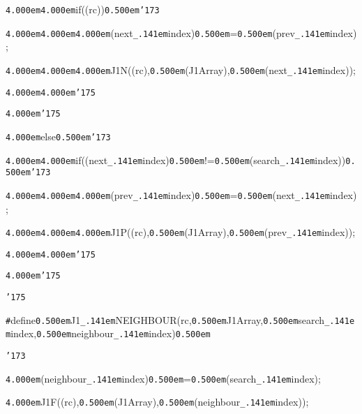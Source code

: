 \noindent
{}{\tt\mc \kern4.000em}{\tt\mc \kern4.000em}if((rc)){\tt\mc \kern0.500em}{\tt\char'173}{\tt{}}

\noindent
{}{\tt\mc \kern4.000em}{\tt\mc \kern4.000em}{\tt\mc \kern4.000em}(next{\tt\_\kern.141em}index){\tt\mc \kern0.500em}={\tt\mc \kern0.500em}(prev{\tt\_\kern.141em}index);{\tt{}}

\noindent
{}{\tt\mc \kern4.000em}{\tt\mc \kern4.000em}{\tt\mc \kern4.000em}J1N((rc),{\tt\mc \kern0.500em}(J1Array),{\tt\mc \kern0.500em}(next{\tt\_\kern.141em}index));{\tt{}}

\noindent
{}{\tt\mc \kern4.000em}{\tt\mc \kern4.000em}{\tt\char'175}{\tt{}}

\noindent
{}{\tt\mc \kern4.000em}{\tt\char'175}{\tt{}}

\noindent
{}{\tt\mc \kern4.000em}else{\tt\mc \kern0.500em}{\tt\char'173}{\tt{}}

\noindent
{}{\tt\mc \kern4.000em}{\tt\mc \kern4.000em}if((next{\tt\_\kern.141em}index){\tt\mc \kern0.500em}!={\tt\mc \kern0.500em}(search{\tt\_\kern.141em}index)){\tt\mc \kern0.500em}{\tt\char'173}{\tt{}}

\noindent
{}{\tt\mc \kern4.000em}{\tt\mc \kern4.000em}{\tt\mc \kern4.000em}(prev{\tt\_\kern.141em}index){\tt\mc \kern0.500em}={\tt\mc \kern0.500em}(next{\tt\_\kern.141em}index);{\tt{}}

\noindent
{}{\tt\mc \kern4.000em}{\tt\mc \kern4.000em}{\tt\mc \kern4.000em}J1P((rc),{\tt\mc \kern0.500em}(J1Array),{\tt\mc \kern0.500em}(prev{\tt\_\kern.141em}index));{\tt{}}

\noindent
{}{\tt\mc \kern4.000em}{\tt\mc \kern4.000em}{\tt\char'175}{\tt{}}

\noindent
{}{\tt\mc \kern4.000em}{\tt\char'175}{\tt{}}

\noindent
{}{\tt\char'175}

\noindent
{}\hfill

\noindent
{}{\tt\#}define{\tt\mc \kern0.500em}J1{\tt\_\kern.141em}NEIGHBOUR(rc,{\tt\mc \kern0.500em}J1Array,{\tt\mc \kern0.500em}search{\tt\_\kern.141em}index,{\tt\mc \kern0.500em}neighbour{\tt\_\kern.141em}index){\tt\mc \kern0.500em}{\tt{}}

\noindent
{}{\tt\char'173}{\tt{}}

\noindent
{}{\tt\mc \kern4.000em}(neighbour{\tt\_\kern.141em}index){\tt\mc \kern0.500em}={\tt\mc \kern0.500em}(search{\tt\_\kern.141em}index);{\tt{}}

\noindent
{}{\tt\mc \kern4.000em}J1F((rc),{\tt\mc \kern0.500em}(J1Array),{\tt\mc \kern0.500em}(neighbour{\tt\_\kern.141em}index));{\tt{}}

